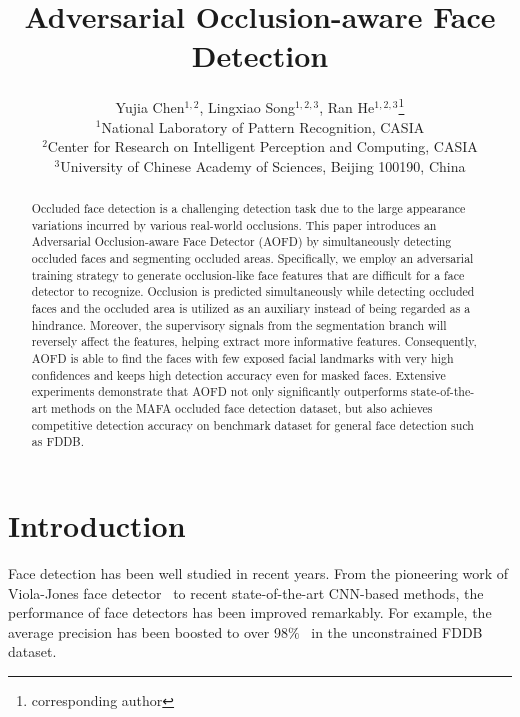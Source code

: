 \documentclass[10pt,twocolumn,letterpaper]{article}
\begin{document}
\title{Adversarial Occlusion-aware Face Detection}


\author{Yujia Chen$^{1,2}$, Lingxiao Song$^{1,2,3}$, Ran He$^{1,2,3}$\thanks{corresponding author}\\
$^1$National Laboratory of Pattern Recognition, CASIA\\
$^2$Center for Research on Intelligent Perception and Computing, CASIA\\
$^3$University of Chinese Academy of Sciences, Beijing 100190, China
}



\maketitle
\thispagestyle{fancy}



\begin{abstract}
Occluded face detection is a challenging detection task due to the large appearance variations incurred by various real-world occlusions. This paper introduces an Adversarial Occlusion-aware Face Detector (AOFD) by simultaneously detecting occluded faces and segmenting occluded areas. Specifically, we employ an adversarial training strategy to generate occlusion-like face features that are difficult for a face detector to recognize. Occlusion is predicted simultaneously while detecting occluded faces and the occluded area is utilized as an auxiliary instead of being regarded as a hindrance. Moreover, the supervisory signals from the segmentation branch will reversely affect the features, helping extract more informative features. Consequently, AOFD is able to find the faces with few exposed facial landmarks with very high confidences and keeps high detection accuracy even for masked faces. Extensive experiments demonstrate that AOFD not only significantly outperforms state-of-the-art methods on the MAFA occluded face detection dataset, but also achieves competitive detection accuracy on benchmark dataset for general face detection such as FDDB.
\end{abstract}



\section{Introduction}

Face detection has been well studied in recent years.
From the pioneering work of Viola-Jones face detector~\cite{viola2001rapid} to recent state-of-the-art CNN-based methods, the performance of face detectors has been improved remarkably. For example, the average precision has been boosted to over 98$\%$~\cite{hu2016tinyface,najibi2017ssh,zhang2017s3fd} in the unconstrained FDDB dataset.
\end{document}
